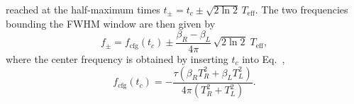 reached at the half-maximum times $t_\pm=t_c\pm\sqrt{2\ln 2}\,T_\mathrm{eff}$. The two frequencies bounding the FWHM window are then given by
\begin{equation}
    f_\pm = f_\mathrm{cfg}(t_c) \pm \frac{\beta_R-\beta_L}{4\pi}\,\sqrt{2\ln 2}\;T_\mathrm{eff},
    \label{eq:frequency_bounds}
\end{equation}
where the center frequency is obtained by inserting $t_c$ into Eq.~,
\begin{equation}
    f_\mathrm{cfg}(t_c) = -\frac{\tau\left(\beta_R T_R^2+\beta_L T_L^2\right)}{4\pi\left(T_R^2+T_L^2\right)}.
    \label{eq:center_frequency}
\end{equation}

